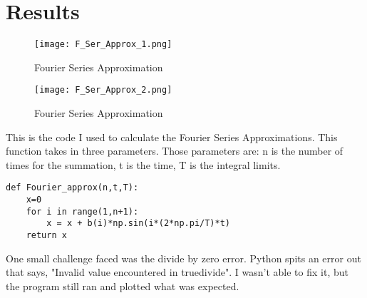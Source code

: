 \documentclass[12pt]{article}
\begin{document}
\section{Results}

\begin{figure}[H]
\caption{Fourier Series Approximation}
\centering
\texttt{[image: F\_Ser\_Approx\_1.png]}
\end{figure}

\begin{figure}[H]
\caption{Fourier Series Approximation}
\centering
\texttt{[image: F\_Ser\_Approx\_2.png]}
\end{figure}

This is the code I used to calculate the Fourier Series Approximations. This function takes in three parameters.  Those parameters are: n is the number of times for the summation, t is the time, T is the integral limits.
\begin{lstlisting}
def Fourier_approx(n,t,T):
    x=0
    for i in range(1,n+1):
        x = x + b(i)*np.sin(i*(2*np.pi/T)*t)
    return x
\end{lstlisting}

One small challenge faced was the divide by zero error. Python spits an error out that says, "Invalid value encountered in true\textunderscore divide". I wasn't able to fix it, but the program still ran and plotted what was expected.

\end{document}
